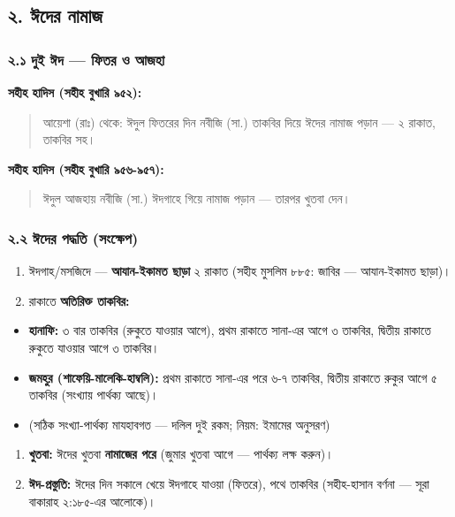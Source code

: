 \subsection*{২. ঈদের নামাজ}

\subsubsection*{২.১ দুই ঈদ — ফিতর ও আজহা}

\textbf{সহীহ হাদিস (সহীহ বুখারি ৯৫২):}

\begin{quote}
আয়েশা (রাঃ) থেকে: ঈদুল ফিতরের দিন নবীজি (সা.) তাকবির দিয়ে ঈদের নামাজ পড়ান — ২ রাকাত, তাকবির সহ।
\end{quote}

\textbf{সহীহ হাদিস (সহীহ বুখারি ৯৫৬-৯৫৭):}

\begin{quote}
ঈদুল আজহায় নবীজি (সা.) ঈদগাহে গিয়ে নামাজ পড়ান — তারপর খুতবা দেন।
\end{quote}

\subsubsection*{২.২ ঈদের পদ্ধতি (সংক্ষেপ)}

\begin{enumerate}
\item ঈদগাহ/মসজিদে — \textbf{আযান-ইকামত ছাড়া} ২ রাকাত (সহীহ মুসলিম ৮৮৫: জাবির — আযান-ইকামত ছাড়া)।
\item রাকাতে \textbf{অতিরিক্ত তাকবির:}
\end{enumerate}
\begin{itemize}
\item \textbf{হানাফি:} ৩ বার তাকবির (রুকুতে যাওয়ার আগে), প্রথম রাকাতে সানা-এর আগে ৩ তাকবির, দ্বিতীয় রাকাতে রুকুতে যাওয়ার আগে ৩ তাকবির।
\item \textbf{জমহুর (শাফেয়ি-মালেকি-হাম্বলি):} প্রথম রাকাতে সানা-এর পরে ৬-৭ তাকবির, দ্বিতীয় রাকাতে রুকুর আগে ৫ তাকবির (সংখ্যায় পার্থক্য আছে)।
\item (সঠিক সংখ্যা-পার্থক্য মাযহাবগত — দলিল দুই রকম; নিয়ম: ইমামের অনুসরণ)
\end{itemize}
\begin{enumerate}
\item \textbf{খুতবা:} ঈদের খুতবা \textbf{নামাজের পরে} (জুমার খুতবা আগে — পার্থক্য লক্ষ করুন)।
\item \textbf{ঈদ-প্রস্তুতি:} ঈদের দিন সকালে খেয়ে ঈদগাহে যাওয়া (ফিতরে), পথে তাকবির (সহীহ-হাসান বর্ণনা — সূরা বাকারাহ ২:১৮৫-এর আলোকে)।
\end{enumerate}
